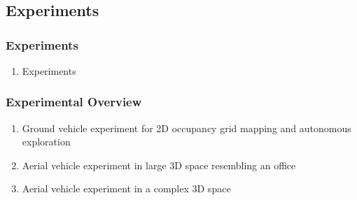 \documentclass[11pt,professionalfonts,hyperref={pdftex,pdfpagemode=none,pdfstartview=FitH}]{beamer}
\begin{document}
\section*{}
\subsection*{Experiments}


\begin{frame}
\frametitle{Experiments}
\begin{enumerate}[I]
\addtocounter{enumi}{3}
	\item Experiments
\end{enumerate}
\end{frame}

\begin{frame}
\frametitle{Experimental Overview}

\begin{enumerate}
	\item Ground vehicle experiment for 2D occupancy grid mapping and autonomous exploration
	\item Aerial vehicle experiment in large 3D space resembling an office
	\item Aerial vehicle experiment in a complex 3D space
\end{enumerate}
\end{frame}
\end{document}

